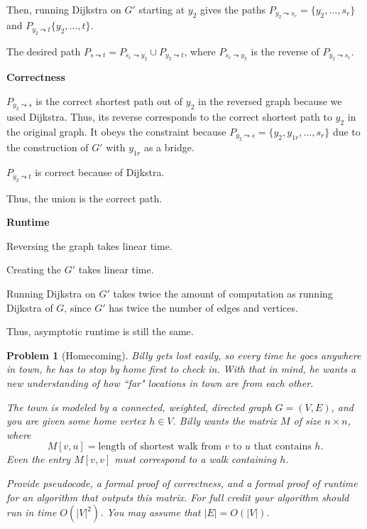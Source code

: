 \documentclass[10pt]{article}
\newtheorem{problem}{\sc\color{cit}Problem}
\begin{document}
\begin{solution}
\begin{enumerate}[(a)]
{            Then, running Dijkstra on $G'$ starting at $y_2$ gives the paths
            $P_{y_2 \leadsto s_r} = \{y_2, \dots, s_r\}$ and 
            $P_{y_2 \leadsto t}\{y_2, \dots, t\}$. 

            The desired path 
            $P_{s \leadsto t} = P_{s_r \leadsto y_2} \cup P_{y_2 \leadsto t}$, 
            where $P_{s_r \leadsto y_2}$ is the reverse of $P_{y_2 \leadsto s_r}$. 

            \textbf{Correctness}
            
            $P_{y_2 \leadsto s}$ is the correct shortest path out of $y_2$ in 
            the reversed graph because we used Dijkstra. 
            Thus, its reverse corresponds to the correct shortest path to $y_2$ 
            in the original graph. 
            It obeys the constraint because 
            $P_{y_2 \leadsto s} = \{y_2, y_{1r}, \dots, s_r\}$ 
            due to the construction of $G'$ with $y_{1r}$ as a bridge. 

            $P_{y_2 \leadsto t}$ is correct because of Dijkstra. 

            Thus, the union is the correct path. 

            \textbf{Runtime}

            Reversing the graph takes linear time. 

            Creating the $G'$ takes linear time. 

            Running Dijkstra on $G'$ takes twice the amount of computation as 
            running Dijkstra of $G$, since $G'$ has twice the number of edges 
            and vertices. 

            Thus, asymptotic runtime is still the same. 


        }

    \end{enumerate}

\end{solution}
\newpage



\begin{problem}[Homecoming]
Billy gets lost easily, so every time he goes anywhere in town, he has to stop by home first to check in. With that in mind, he wants a new understanding of how ``far" locations in town are from each other. 

The town is modeled by a connected, weighted, directed graph $G=(V, E)$, and you are given some home vertex $h \in V$. Billy wants the matrix $M$ of size $n \times n$, where 
\[ 
    M[v, u] = \text{length of shortest walk from }v\text{ to }u \text{ that contains }h.
\]
Even the entry $M[v, v]$ must correspond to a walk containing $h$.

Provide pseudocode, a formal proof of correctness, and a formal proof of runtime for an algorithm that outputs this matrix. For full credit your algorithm should run in time $O(|V|^2)$. You may assume that $|E| = O(|V|)$. 
\end{problem}
\end{document}
